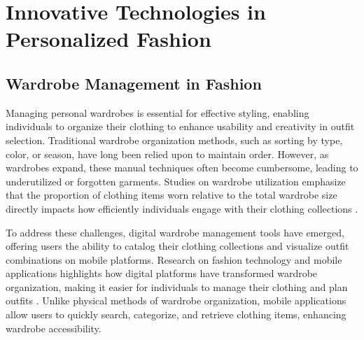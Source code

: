 
\chapter{Innovative Technologies in Personalized Fashion}
\label{chap:Chaptert2}


\section{Wardrobe Management in Fashion}
Managing personal wardrobes is essential for effective styling, enabling individuals to organize their clothing to enhance usability and creativity in outfit selection. Traditional wardrobe organization methods, such as sorting by type, color, or season, have long been relied upon to maintain order. However, as wardrobes expand, these manual techniques often become cumbersome, leading to underutilized or forgotten garments. Studies on wardrobe utilization emphasize that the proportion of clothing items worn relative to the total wardrobe size directly impacts how efficiently individuals engage with their clothing collections \cite{choo14}.

To address these challenges, digital wardrobe management tools have emerged, offering users the ability to catalog their clothing collections and visualize outfit combinations on mobile platforms. Research on fashion technology and mobile applications highlights how digital platforms have transformed wardrobe organization, making it easier for individuals to manage their clothing and plan outfits \cite{nie2013between}. Unlike physical methods of wardrobe organization, mobile applications allow users to quickly search, categorize, and retrieve clothing items, enhancing wardrobe accessibility.

